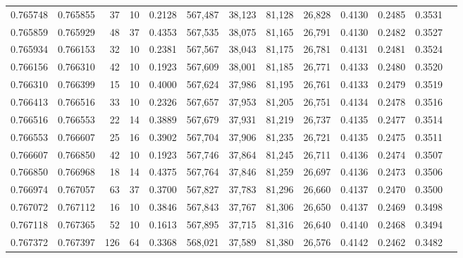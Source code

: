 \begin{tabular}{rrrrrrrrrrrrr}
0.765748 & 0.765855 &    37 &  10 &                                     0.2128 & 567,487 &  38,123 &  81,128 &  26,828 & 0.4130 & 0.2485 & 0.3531 \\
0.765859 & 0.765929 &    48 &  37 &                                     0.4353 & 567,535 &  38,075 &  81,165 &  26,791 & 0.4130 & 0.2482 & 0.3527 \\
0.765934 & 0.766153 &    32 &  10 &                                     0.2381 & 567,567 &  38,043 &  81,175 &  26,781 & 0.4131 & 0.2481 & 0.3524 \\
0.766156 & 0.766310 &    42 &  10 &                                     0.1923 & 567,609 &  38,001 &  81,185 &  26,771 & 0.4133 & 0.2480 & 0.3520 \\
0.766310 & 0.766399 &    15 &  10 &                                     0.4000 & 567,624 &  37,986 &  81,195 &  26,761 & 0.4133 & 0.2479 & 0.3519 \\
0.766413 & 0.766516 &    33 &  10 &                                     0.2326 & 567,657 &  37,953 &  81,205 &  26,751 & 0.4134 & 0.2478 & 0.3516 \\
0.766516 & 0.766553 &    22 &  14 &                                     0.3889 & 567,679 &  37,931 &  81,219 &  26,737 & 0.4135 & 0.2477 & 0.3514 \\
0.766553 & 0.766607 &    25 &  16 &                                     0.3902 & 567,704 &  37,906 &  81,235 &  26,721 & 0.4135 & 0.2475 & 0.3511 \\
0.766607 & 0.766850 &    42 &  10 &                                     0.1923 & 567,746 &  37,864 &  81,245 &  26,711 & 0.4136 & 0.2474 & 0.3507 \\
0.766850 & 0.766968 &    18 &  14 &                                     0.4375 & 567,764 &  37,846 &  81,259 &  26,697 & 0.4136 & 0.2473 & 0.3506 \\
0.766974 & 0.767057 &    63 &  37 &                                     0.3700 & 567,827 &  37,783 &  81,296 &  26,660 & 0.4137 & 0.2470 & 0.3500 \\
0.767072 & 0.767112 &    16 &  10 &                                     0.3846 & 567,843 &  37,767 &  81,306 &  26,650 & 0.4137 & 0.2469 & 0.3498 \\
0.767118 & 0.767365 &    52 &  10 &                                     0.1613 & 567,895 &  37,715 &  81,316 &  26,640 & 0.4140 & 0.2468 & 0.3494 \\
0.767372 & 0.767397 &   126 &  64 &                                     0.3368 & 568,021 &  37,589 &  81,380 &  26,576 & 0.4142 & 0.2462 & 0.3482 \\

\end{tabular}
